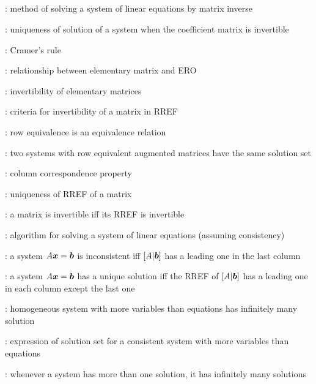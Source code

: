 \subsection*{}
\item {}: method of solving a system of linear
equations by matrix inverse
\item {}: uniqueness of solution of a system when the coefficient matrix is invertible
\item {}: Cramer's rule
\item {}: relationship between elementary matrix and ERO
\item {}: invertibility of elementary matrices
\item {}: criteria for invertibility of a matrix in RREF
\item {}: row equivalence is an equivalence relation
\item {}: two systems with row equivalent augmented matrices have the same solution set
\item {}: column correspondence property
\item {}: uniqueness of RREF of a matrix
\item {}: a matrix is invertible iff its RREF is invertible
\item {}: algorithm for solving a system of linear equations (assuming consistency)
\item {}: a system \(A\vb*{x}=\vb*{b}\) is inconsistent iff \([A|\vb*{b}]\) has a leading one in the last column
\item {}: a system \(A\vb*{x}=\vb*{b}\) has a unique solution iff the RREF of \([A|\vb*{b}]\) has a leading one in each column except the last one
\item {}: homogeneous system with more variables than equations has infinitely many solution
\item {}: expression of solution set for a consistent system with more variables than equations
\item {}: whenever a system has more than one solution, it has infinitely many solutions
